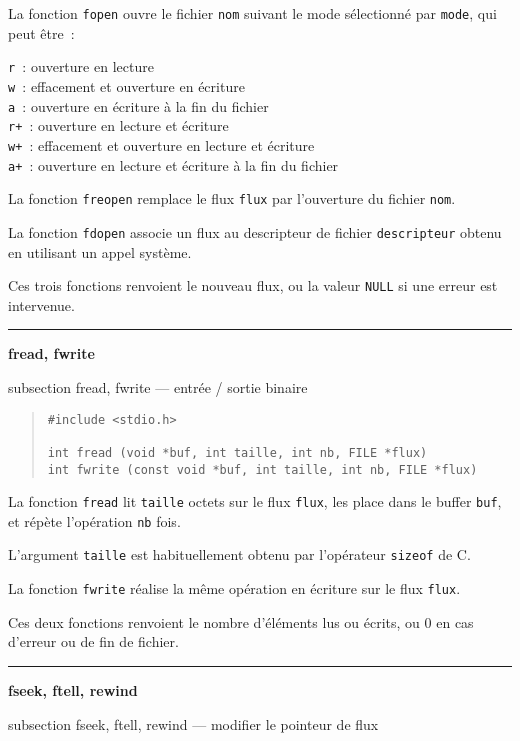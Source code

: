 \documentclass [twoside] {report}
\newcommand {\primitive} [1]
    {
	\phantomsection
	{\large \bf #1}
	\addcontentsline {toc} {subsection} {#1}
    }
\newcommand {\separation}
    {
	\vspace {5mm}
	\nopagebreak
	\hrule
    }
\begin{document}
La fonction {\tt fopen} ouvre le fichier {\tt nom} suivant le
mode sélectionné par {\tt mode}, qui peut être~: \par
{\tt r  }: ouverture en lecture \\
{\tt w  }: effacement et ouverture en écriture \\
{\tt a  }: ouverture en écriture à la fin du fichier \\
{\tt r+ }: ouverture en lecture et écriture \\
{\tt w+ }: effacement et ouverture en lecture et écriture \\
{\tt a+ }: ouverture en lecture et écriture à la fin du fichier 

La fonction {\tt freopen} remplace le flux {\tt flux} par
l'ouverture du fichier {\tt nom}.

La fonction {\tt fdopen} associe un flux au descripteur de
fichier {\tt descripteur} obtenu en utilisant un appel
système.

Ces trois fonctions renvoient le nouveau flux, ou la valeur
{\tt NULL} si une erreur est intervenue.



\separation
\primitive {fread, fwrite} --- entrée / sortie binaire

\begin {quote}
\begin {verbatim}
#include <stdio.h>

int fread (void *buf, int taille, int nb, FILE *flux)
int fwrite (const void *buf, int taille, int nb, FILE *flux)
\end{verbatim}
\end {quote}

La fonction {\tt fread} lit {\tt taille} octets sur le flux
{\tt flux}, les place dans le buffer {\tt buf}, et répète
l'opération {\tt nb} fois.

L'argument {\tt taille} est habituellement obtenu par
l'opérateur {\tt sizeof} de C.

La fonction {\tt fwrite} réalise la même opération en écriture
sur le flux {\tt flux}.

Ces deux fonctions renvoient le nombre d'éléments lus ou
écrits, ou 0 en cas d'erreur ou de fin de fichier.



\separation
\primitive {fseek, ftell, rewind} --- modifier le pointeur de flux
\end{document}
